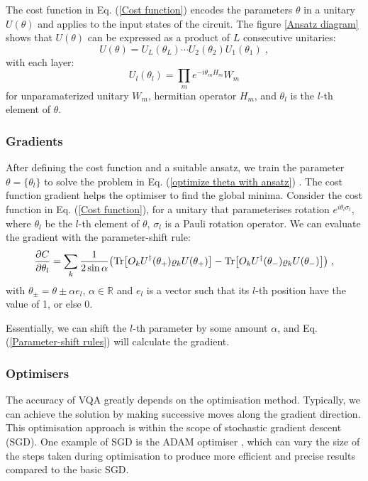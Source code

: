 The cost function in Eq. (\ref{Cost function}) encodes the parameters $\theta$ in a unitary $U(\theta)$ and applies to the input states of the circuit. 
The figure \ref{Ansatz diagram} shows that $U(\theta)$ can be expressed as a product of $L$ consecutive unitaries:
\begin{equation}
    U(\theta) = U_L(\theta_L) \cdots U_2(\theta_2) U_1(\theta_1)\;,
\end{equation}
with each layer:
\begin{equation}
    U_l(\theta_l) = \prod_m e^{-i\theta_m H_m} W_m
\end{equation}
for unparamaterized unitary $W_m$, hermitian operator $H_m$, and $\theta_l$ is the $l$-th element of $\theta$.

\subsubsection{Gradients}
After defining the cost function and a suitable ansatz, we train the parameter $\theta = \{\theta_{l}\}$ to solve the problem in Eq. (\ref{optimize theta with ansatz}) \cite{cerezo2021variational}.
The cost function gradient helps the optimiser to find the global minima. 
Consider the cost function in Eq. (\ref{Cost function}), for a unitary that parameterises rotation $e^{i \theta_l \sigma_{l}}$, where $\theta_l$ be the $l$-th element of $\theta$, $\sigma_l$ is a Pauli rotation operator. 
We can evaluate the gradient with the parameter-shift rule:
\begin{equation}
    \frac{\partial C}{\partial\theta_l}
    = \sum_k \frac{1}{2 \sin{\alpha}} 
    \left( 
        \Tr[O_k U^\dagger(\theta_+) \rho_k U(\theta_+)] 
        - \Tr[O_k U^\dagger(\theta_-) \rho_k U(\theta_-)]
    \right) \;,
    \label{Parameter-shift rules}
\end{equation}
with $\theta_{\pm} = \theta \pm \alpha e_l$, $\alpha \in \mathbb{R}$ and $e_l$ is a vector such that its $l$-th position have the value of 1, or else 0.

Essentially, we can shift the $l$-th parameter by some amount $\alpha$, and Eq. (\ref{Parameter-shift rules}) will calculate the gradient. 


\subsubsection{Optimisers}
The accuracy of VQA greatly depends on the optimisation method.
Typically, we can achieve the solution by making successive moves along the gradient direction.
This optimisation approach is within the scope of stochastic gradient descent (SGD).
One example of SGD is the ADAM optimiser \cite{kingmaAdamMethodStochastic2014}, which can vary the size of the steps taken during optimisation to produce more efficient and precise results compared to the basic SGD.


